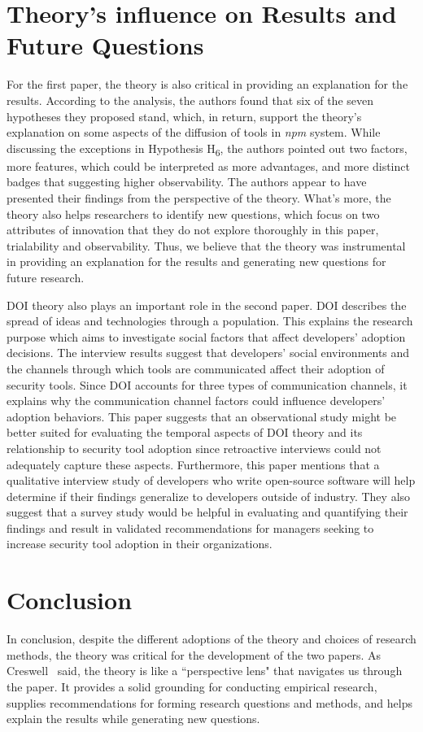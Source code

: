 \documentclass[journal,12pt,onecolumn,]{IEEEtran}
\begin{document}
\section{Theory's influence on Results and Future Questions}
For the first paper, the theory is also critical in providing an explanation for the results. According to the analysis, the authors found that six of the seven hypotheses they proposed
stand, which, in return, support the theory's explanation on some aspects of the diffusion of tools in \textit{npm} system. While discussing the exceptions in Hypothesis H\textsubscript{6},
the authors pointed out two factors, more features, which could be interpreted as more advantages, and more distinct badges that suggesting higher observability. The authors appear to have presented their findings from the perspective of the theory.
What's more, the theory also helps researchers to identify new questions, which focus on two attributes of innovation that they do not explore thoroughly in this paper, trialability and observability.
Thus, we believe that the theory was instrumental in providing an explanation for the results and generating new questions for future research.

DOI theory also plays an important role in the second paper. DOI describes the spread of ideas and technologies through a population. This explains the research purpose which aims to investigate social factors that affect developers’ adoption decisions. 
The interview results suggest that developers' social environments and the channels through which tools are communicated affect their adoption of security tools. Since DOI accounts for three types of communication channels, it explains why the communication channel factors could influence developers’ adoption behaviors. 
This paper suggests that an observational study might be better suited for evaluating the temporal aspects of DOI theory and its relationship to security tool adoption since retroactive interviews could not adequately capture these aspects. Furthermore, this paper mentions that a qualitative interview study of developers who write open-source software will help determine if their findings generalize to developers outside of industry. 
They also suggest that a survey study would be helpful in evaluating and quantifying their findings and result in validated recommendations for managers seeking to increase security tool adoption in their organizations.
\section{Conclusion} %
In conclusion, despite the different adoptions of the theory and choices of research methods, the theory was critical for the development of the two papers.
As Creswell~\cite{creswell2017research} said, the theory is like a ``perspective lens" that navigates us through the paper. It provides a solid grounding for conducting empirical research, supplies recommendations for forming research questions and methods,
and helps explain the results while generating new questions. 
\end{document}
